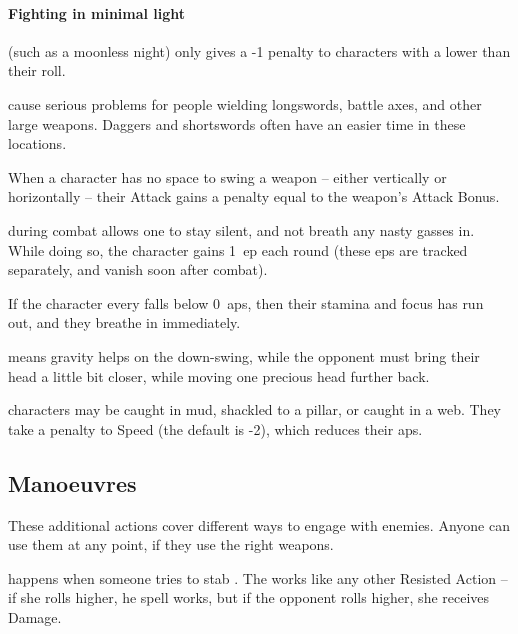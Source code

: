 \begin{multicols}{2}
\paragraph{Fighting in minimal light}
(such as a moonless night)
only gives a -1 penalty to characters with a  lower than their roll.

cause serious problems for people wielding longswords, battle axes, and other large weapons.
Daggers and shortswords often have an easier time in these locations.

When a character has no space to swing a weapon -- either vertically or horizontally -- their Attack gains a penalty equal to the weapon's Attack Bonus.

during combat allows one to stay silent, and not breath any nasty gasses in.
While doing so, the character gains 1~\gls{ep} each round (these \glspl{ep} are tracked separately, and vanish soon after combat).

If the character every falls below 0~\glspl{ap}, then their stamina and focus has run out, and they breathe in immediately.

means gravity helps on the down-swing, while the opponent must bring their head a little bit closer, while moving one precious head further back.

\label{trapped}
\label{prone}
characters may be caught in mud, shackled to a pillar, or caught in a web.
They take a penalty to Speed (the default is -2), which reduces their \glspl{ap}.

\subsection{Manoeuvres}

These additional actions cover different ways to engage with enemies.
Anyone can use them at any point, if they use the right weapons.

happens when someone tries to stab .
The works like any other Resisted Action -- if she rolls higher, he spell works, but if the opponent rolls higher, she receives Damage.


\end{multicols}
